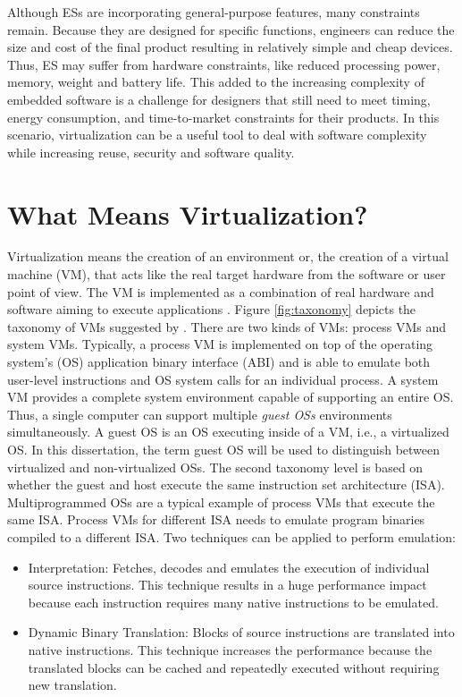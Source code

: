 Although ESs are incorporating general-purpose features, many constraints remain. Because they are designed for specific functions, engineers can reduce the size and cost of the final product resulting in relatively simple and cheap devices. Thus, ES may suffer from hardware constraints, like reduced processing power, memory, weight and battery life. This added to the increasing complexity of embedded software is a challenge for designers that still need to meet timing, energy consumption, and time-to-market constraints for their products. In this scenario, virtualization can be a useful tool to deal with software complexity while increasing reuse, security and software quality. 


\section{What Means Virtualization?}
\label{section:virtualization}

Virtualization means the creation of an environment or, the creation of a virtual machine (VM), that acts like the real target hardware from the software or user point of view. The VM is implemented as a combination of real hardware and software aiming to execute applications \cite{Smith2005}. Figure \ref{fig:taxonomy} depicts the taxonomy of VMs suggested by \cite{Smith2005}. There are two kinds of VMs: process VMs and system VMs. Typically, a process VM is implemented on top of the operating system's (OS) application binary interface (ABI) and is able to emulate both user-level instructions and OS system calls for an individual process. A system VM provides a complete system environment capable of  supporting an entire OS. Thus, a single computer can support multiple \textit{guest OSs} environments simultaneously. A guest OS is an OS executing inside of a VM, i.e., a virtualized OS. In this dissertation, the term guest OS will be used to distinguish between virtualized and non-virtualized OSs. The second taxonomy level is based on whether the guest and host execute the same instruction set architecture (ISA). Multiprogrammed OSs are a typical example of process VMs that execute the same ISA. Process VMs for different ISA needs to emulate program binaries compiled to a different ISA. Two techniques can be applied to perform emulation: 

\begin{itemize}
  \item Interpretation: Fetches, decodes and emulates the execution of individual source instructions. This technique results in a huge performance impact because each instruction requires many native instructions to be emulated.
  \item Dynamic Binary Translation: Blocks of source instructions are translated into native instructions. This technique increases the performance because the translated blocks can be cached and repeatedly executed without requiring new translation. 
\end{itemize}


